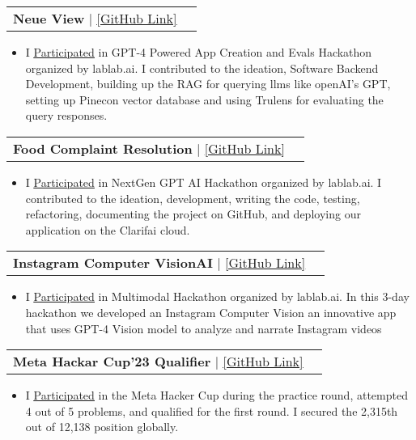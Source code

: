 \documentclass[letterpaper,11pt]{article}
\makeatletter
\newcommand{\resumeItem}[1]{
  \item\small{
    {#1 \vspace{-2pt}}
  }
}
\newcommand{\resumeProjectHeading}[2]{
    \item
    \begin{tabular*}{0.97\textwidth}{l@{\extracolsep{\fill}}r}
      \small#1 & #2 \\
    \end{tabular*}\vspace{-7pt}
}
\newcommand{\resumeItemListStart}{\begin{itemize}}
\newcommand{\resumeItemListEnd}{\end{itemize}\vspace{-5pt}}
\makeatother
\begin{document}
\resumeProjectHeading
{\textbf{Neue View} $|$ \href{https://github.com/inamprograms/neue-view}{\underline{[GitHub Link]}}}{}
\resumeItemListStart
\resumeItem{I \href{https://www.linkedin.com/feed/update/urn:li:activity:7166859396008943616/}{\underline{Participated}} in  GPT-4 Powered App Creation and Evals Hackathon organized by lablab.ai. I contributed to the ideation, Software Backend Development, building up the RAG for querying llms like openAI's GPT, setting up Pinecon vector database and using Trulens for evaluating the query responses.\newline\newline}
\resumeItemListEnd

\resumeProjectHeading
{\textbf{Food Complaint Resolution} $|$ \href{https://github.com/inamprograms/Food-complaint-resolution-app}{\underline{[GitHub Link]}}}{}
\resumeItemListStart
\resumeItem{I \href{https://www.linkedin.com/posts/inamulrehman_github-inamprogramsfood-complaint-resolution-app-activity-7155149817424289793-maPt?utm_source=share&utm_medium=member_desktop}{\underline{Participated}} in NextGen GPT AI Hackathon organized by lablab.ai. I contributed to the ideation, development, writing the code, testing, refactoring, documenting the project on GitHub, and deploying our application on the Clarifai cloud.}
\resumeItemListEnd

\resumeProjectHeading
{\textbf{Instagram Computer VisionAI} $|$ \href{https://github.com/inamprograms/InstagramComputerVisionAI}{\underline{[GitHub Link]}}}{}
\resumeItemListStart
\resumeItem{I \href{https://www.linkedin.com/posts/inamulrehman_github-louvivieninstagramcomputervisionai-activity-7132411114637656065-9ApD?utm_source=share&utm_medium=member_desktop}{\underline{Participated}} in Multimodal Hackathon organized by lablab.ai. In this 3-day hackathon we developed an Instagram Computer Vision an innovative app that uses GPT-4 Vision model to analyze and narrate Instagram videos}
\resumeItemListEnd

\resumeProjectHeading
{\textbf{Meta Hackar Cup'23 Qualifier} $|$ \href{https://github.com/inamprograms/Meta-hacker-cup-2023-Qualification-Round}{\underline{[GitHub Link]}}}{}
\resumeItemListStart
\resumeItem{I \href{https://www.linkedin.com/posts/inamulrehman_icodeguru-icodeguru-activity-7112400935330455552-bplE?utm_source=share&utm_medium=member_desktop}{\underline{Participated}} in the Meta Hacker Cup during the practice round, attempted 4 out of 5 problems, and qualified for the first round. I secured the 2,315th out of 12,138 position globally.}
\resumeItemListEnd
\end{document}
